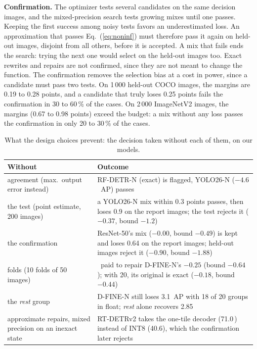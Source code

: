 \documentclass[conference]{IEEEtran}
\newcommand{\ms}{\,\text{ms}}
\begin{document}
\textbf{Confirmation.} The optimizer tests several candidates on the same decision images, and the mixed-precision search tests growing mixes until one passes. Keeping the first success among noisy tests favors an underestimated loss. An approximation that passes Eq.~(\ref{eq:noninf}) must therefore pass it again on held-out images, disjoint from all others, before it is accepted. A mix that fails ends the search: trying the next one would select on the held-out images too. Exact rewrites and repairs are not confirmed, since they are not meant to change the function. The confirmation removes the selection bias at a cost in power, since a candidate must pass two tests. On 1\,000 held-out COCO images, the margins are 0.19 to 0.28 points, and a candidate that truly loses 0.25 points fails the confirmation in 30 to 60\,\% of the cases. On 2\,000 ImageNetV2 images, the margins (0.67 to 0.98 points) exceed the budget: a mix without any loss passes the confirmation in only 20 to 30\,\% of the cases.

\begin{table}[t]
\caption{What the design choices prevent: the decision taken without each of them, on our models.}
\label{tab:ablation}
\centering
\footnotesize
\setlength{\tabcolsep}{3pt}
\begin{tabular}{@{}>{\raggedright\arraybackslash}p{}>{\raggedright\arraybackslash}p{}@{}}
\toprule
Without & Outcome \\
\midrule
agreement (max.\ output error instead) & RF-DETR-N (exact) is flagged, YOLO26-N ($-4.6$~AP) passes \\
the test (point estimate, 200 images) & a YOLO26-N mix within 0.3 points passes, then loses 0.9 on the report images; the test rejects it ($-0.37$, bound $-1.2$) \\
the confirmation & ResNet-50's mix ($-0.00$, bound $-0.49$) is kept and loses 0.64 on the report images; held-out images reject it ($-0.90$, bound $-1.88$) \\
20 folds (10 folds of 50 images) & 15\ms{} paid to repair D-FINE-N's $-0.25$ (bound $-0.64$); with 20, its original is exact ($-0.18$, bound $-0.44$) \\
the \emph{rest} group & D-FINE-N still loses 3.1~AP with 18 of 20 groups in float; \emph{rest} alone recovers 2.85 \\
approximate repairs, mixed precision on an inexact state & RT-DETRv2 takes the one-tile decoder (71.0\ms{}) instead of INT8 (40.6), which the confirmation later rejects \\
\bottomrule
\end{tabular}
\end{table}
\end{document}
